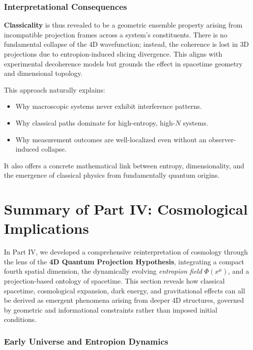 \documentclass[12pt]{article}
\begin{document}
\subsubsection*{Interpretational Consequences}

\textbf{Classicality} is thus revealed to be a geometric ensemble property arising from incompatible projection frames across a system’s constituents. There is no fundamental collapse of the 4D wavefunction; instead, the coherence is lost in 3D projections due to entropion-induced slicing divergence. This aligns with experimental decoherence models but grounds the effect in spacetime geometry and dimensional topology.

This approach naturally explains:
\begin{itemize}
    \item Why macroscopic systems never exhibit interference patterns.
    \item Why classical paths dominate for high-entropy, high-$N$ systems.
    \item Why measurement outcomes are well-localized even without an observer-induced collapse.
\end{itemize}
It also offers a concrete mathematical link between entropy, dimensionality, and the emergence of classical physics from fundamentally quantum origins.

\section*{Summary of Part IV: Cosmological Implications}

In Part IV, we developed a comprehensive reinterpretation of cosmology through the lens of the \textbf{4D Quantum Projection Hypothesis}, integrating a compact fourth spatial dimension, the dynamically evolving \emph{entropion field} $\Phi(x^\mu)$, and a projection-based ontology of spacetime. This section reveals how classical spacetime, cosmological expansion, dark energy, and gravitational effects can all be derived as emergent phenomena arising from deeper 4D structures, governed by geometric and informational constraints rather than imposed initial conditions.

\subsubsection*{Early Universe and Entropion Dynamics}
\end{document}

